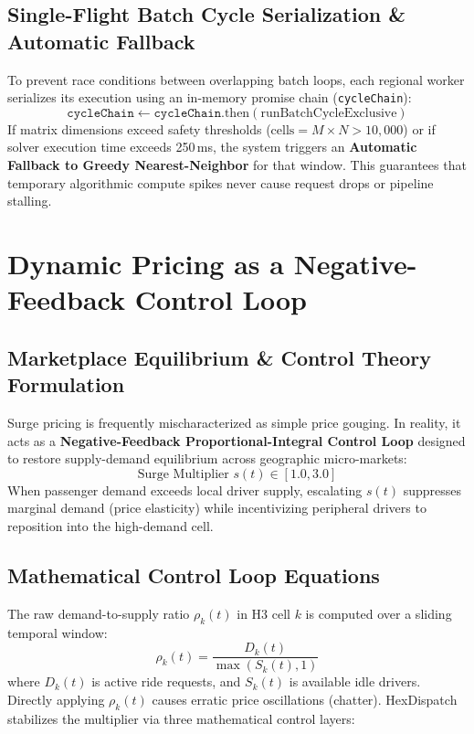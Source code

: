 \documentclass[11pt,a4paper]{article}
\begin{document}
\subsection{Single-Flight Batch Cycle Serialization \& Automatic Fallback}
To prevent race conditions between overlapping batch loops, each regional worker serializes its execution using an in-memory promise chain (\texttt{cycleChain}):
\begin{equation}
    \texttt{cycleChain} \leftarrow \texttt{cycleChain}.\text{then}(\text{runBatchCycleExclusive})
\end{equation}
If matrix dimensions exceed safety thresholds ($\text{cells} = M \times N > 10,000$) or if solver execution time exceeds 250\,ms, the system triggers an \textbf{Automatic Fallback to Greedy Nearest-Neighbor} for that window. This guarantees that temporary algorithmic compute spikes never cause request drops or pipeline stalling.

\section{Dynamic Pricing as a Negative-Feedback Control Loop}

\subsection{Marketplace Equilibrium \& Control Theory Formulation}
Surge pricing is frequently mischaracterized as simple price gouging. In reality, it acts as a \textbf{Negative-Feedback Proportional-Integral Control Loop} designed to restore supply-demand equilibrium across geographic micro-markets:
\begin{equation}
    \text{Surge Multiplier } s(t) \in [1.0, 3.0]
\end{equation}
When passenger demand exceeds local driver supply, escalating $s(t)$ suppresses marginal demand (price elasticity) while incentivizing peripheral drivers to reposition into the high-demand cell.

\subsection{Mathematical Control Loop Equations}
The raw demand-to-supply ratio $\rho_k(t)$ in H3 cell $k$ is computed over a sliding temporal window:
\begin{equation}
    \rho_k(t) = \frac{D_k(t)}{\max(S_k(t), 1)}
\end{equation}
where $D_k(t)$ is active ride requests, and $S_k(t)$ is available idle drivers. Directly applying $\rho_k(t)$ causes erratic price oscillations (chatter). HexDispatch stabilizes the multiplier via three mathematical control layers:
\end{document}
